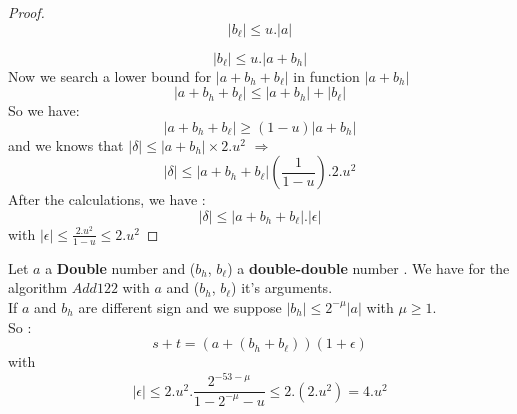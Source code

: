 \begin{proof}
$$ \lvert b_{\ell} \rvert \le u.\lvert a \rvert $$

$$ \lvert b_{\ell} \rvert \le u.\lvert a + b_h\rvert $$
Now we search a lower bound for $\lvert a+b_h+b_{\ell} \rvert $ in function $\lvert a+b_h \rvert $ \\
$$ \lvert  a + b_h  + b_{\ell} \rvert \le \lvert a + b_h\rvert +  \lvert b_{\ell}\rvert$$
So we have:
$$ \lvert  a + b_h  + b_{\ell} \rvert \ge (1 - u)\lvert a + b_h\rvert $$
and we knows that $\lvert \delta \rvert \le \lvert a + b_h \rvert \times  2.u^2$ $\Rightarrow$
 $$\lvert \delta \rvert \le \lvert a + b_h + b_{\ell} \rvert (\frac{1}{1-u}).2.u^2$$
 After the calculations, we have :\\
 $$\lvert \delta \rvert \le \lvert a + b_h + b_{\ell} \rvert . \lvert \epsilon \rvert$$
 with $\lvert \epsilon \rvert \le \frac{2.u^2}{1-u} \le 2.u^2$
\end{proof}


\begin{theo}
Let $a$ a \textbf{Double} number  and ($b_h$, $b_{\ell}$) a \textbf{double-double} number . We have for the algorithm $Add122$ with
$a$ and ($b_h$, $b_{\ell}$) it's arguments.\\
If $a$ and $b_h$ are different sign and we suppose $\lvert b_h \rvert \le 2^{-\mu} \lvert a \rvert $ with $\mu \ge 1$.\\
So :
$$ s+t = (a+  (b_h + b_{\ell}))(1+\epsilon)$$
with $$\lvert \epsilon \rvert \le 2.u^2 .\frac{2^{-53 - \mu}}{1 - 2^{-\mu} - u} \le 2.(2.u^2) = 4.u^2$$
\end{theo}

